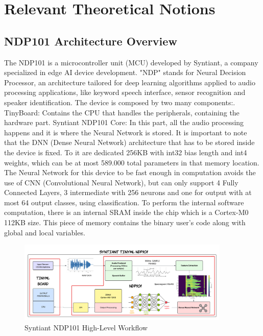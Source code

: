 \chapter{Relevant Theoretical Notions}
\label{cha:background}

\section{NDP101 Architecture Overview}
\label{sec:architecture}
The NDP101 is a microcontroller unit (MCU) developed by Syntiant\cite{description_ndp101}, a company specialized in edge AI device development. "NDP" stands for Neural Decision Processor, an architecture tailored for deep learning algorithms applied to audio processing applications, like keyword speech interface, sensor recognition and speaker identification. The device is composed by two many components:. TinyBoard: Contains the CPU that handles the peripherals, containing the hardware part. Syntiant NDP101 Core: In this part, all the audio processing happens and it is where the Neural Network is stored. It is important to note that the DNN (Dense Neural Network) architecture that has to be stored inside the device is fixed. To it are dedicated 256KB with int32 bias length and int4 weights, which can be at most 589.000 total parameters in that memory location. The Neural Network for this device to be fast enough in computation avoids the use of CNN (Convolutional Neural Network), but can only support 4 Fully Connected Layers, 3 intermediate with 256 neurons and one for output with at most 64 output classes, using classification. To perform the internal software computation, there is an internal SRAM inside the chip which is a Cortex-M0 112KB size. This piece of memory contains the binary user's code along with global and local variables.
\begin{figure}[!h]
    \centering
        \includegraphics[width=0.9\textwidth]{images/2.01 NDP101 High Level Workflow.png}
        \caption{Syntiant NDP101 High-Level Workflow}
\end{figure}
